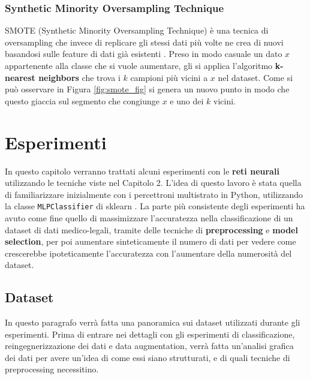 \documentclass[12pt, twoside, letterpaper]{report}
\begin{document}
			\subsection{Synthetic Minority Oversampling Technique} \label{sec:smote}
				SMOTE (Synthetic Minority Oversampling Technique) è una tecnica di oversampling che invece di replicare gli stessi dati più volte ne crea di nuovi basandosi sulle feature di dati già esistenti \cite{smote}. Preso in modo casuale un dato $x$ appartenente alla classe che si vuole aumentare, gli si applica l'algoritmo \textbf{k-nearest neighbors} che trova i $k$ campioni più vicini a $x$ nel dataset. Come si può osservare in Figura \ref{fig:smote_fig} si genera un nuovo punto in modo che questo giaccia sul segmento che congiunge $x$ e uno dei $k$ vicini. 


	\chapter{Esperimenti} \label{chap:esperimenti}
		In questo capitolo verranno trattati alcuni esperimenti con le \textbf{reti neurali} utilizzando le tecniche viste nel Capitolo 2. L'idea di questo lavoro è stata quella di familiarizzare inizialmente con i percettroni multistrato in Python, utilizzando la classe \texttt{MLPClassifier} di sklearn \cite{sklearn}. La parte più consistente degli esperimenti ha avuto come fine quello di massimizzare l'accuratezza nella classificazione di un dataset di dati medico-legali, tramite delle tecniche di \textbf{preprocessing} e \textbf{model selection}, per poi aumentare sinteticamente il numero di dati per vedere come crescerebbe ipoteticamente l'accuratezza con l'aumentare della numerosità del dataset.
	
	\section{Dataset} 
		In questo paragrafo verrà fatta una panoramica sui dataset utilizzati durante gli esperimenti. Prima di entrare nei dettagli con gli esperimenti di classificazione, reingegnerizzazione dei dati e data augmentation, verrà fatta un'analisi grafica dei dati per avere un'idea di come essi siano strutturati, e di quali tecniche di preprocessing necessitino.
		\begin{table}
			\noindent{}
			\caption{\label{tab:iris}Tre misurazioni appartenenti all'iris dataset.}
		\end{table}
			
\end{document}
